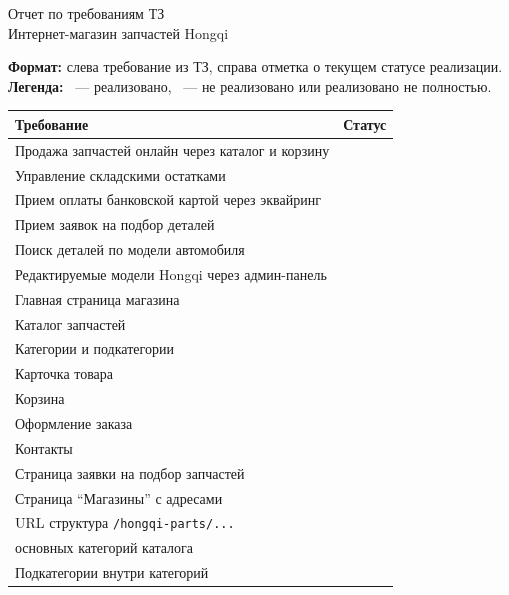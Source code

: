 \documentclass[12pt,a4paper]{article}
\newcommand{\done}{\ding{51}}
\newcommand{\notdone}{\ding{113}}
\begin{document}
\begin{center}
{\LARGE Отчет по требованиям ТЗ} \\
\vspace{4pt}
{\large Интернет-магазин запчастей Hongqi}
\end{center}

\textbf{Формат:} слева требование из ТЗ, справа отметка о текущем статусе реализации. \\
\textbf{Легенда:} \done\ --- реализовано, \notdone\ --- не реализовано или реализовано не полностью.

\vspace{8pt}

\begin{longtable}{>{\raggedright\arraybackslash}p{} >{\centering\arraybackslash}p{}}
\toprule
\textbf{Требование} & \textbf{Статус} \\
\midrule
\endhead

Продажа запчастей онлайн через каталог и корзину & \done \\
Управление складскими остатками & \done \\
Прием оплаты банковской картой через эквайринг & \notdone \\
Прием заявок на подбор деталей & \done \\
Поиск деталей по модели автомобиля & \done \\

Редактируемые модели Hongqi через админ-панель & \done \\
Главная страница магазина & \done \\
Каталог запчастей & \done \\
Категории и подкатегории & \done \\
Карточка товара & \done \\
Корзина & \done \\
Оформление заказа & \done \\
Контакты & \done \\
Страница заявки на подбор запчастей & \done \\
Страница ``Магазины'' с адресами & \done \\

URL структура \texttt{/hongqi-parts/...} & \done \\
8 основных категорий каталога & \done \\
Подкатегории внутри категорий & \done \\


\end{longtable}
\end{document}
